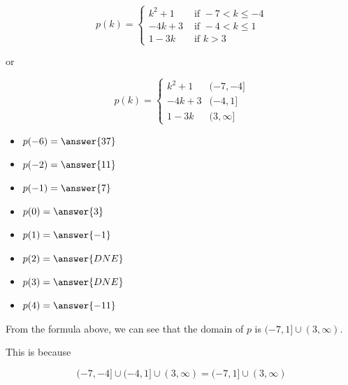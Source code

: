 \documentclass{ximera}
\begin{document}
\begin{question} 


\[
p(k) = 
\begin{cases}
  k^2 + 1 & \text{ if } -7 < k \leq -4 \\
  -4k + 3 & \text{ if } -4 < k \leq 1 \\
  1 - 3k & \text{ if } k > 3
\end{cases}
\]


or


\[
p(k) = 
\begin{cases}
  k^2 + 1 & (-7, -4] \\
  -4k + 3 & (-4, 1] \\
  1 - 3k & (3, \infty]
\end{cases}
\]



\begin{itemize}
\item $p(-6) = \answer{37}$  
\item $p(-2) = \answer{11}$ 
\item $p(-1) = \answer{7}$ 
\item $p(0) = \answer{3}$ 
\item $p(1) = \answer{-1}$ 
\item $p(2) = \answer{DNE}$ 
\item $p(3) = \answer{DNE}$ 
\item $p(4) = \answer{-11}$ 
\end{itemize}

\end{question}



From the formula above, we can see that the domain of $p$ is $(-7, 1] \cup (3, \infty)$. 

This is because


\[
(-7, -4] \cup (-4, 1] \cup (3, \infty) = (-7, 1] \cup (3, \infty)
\]
\end{document}
